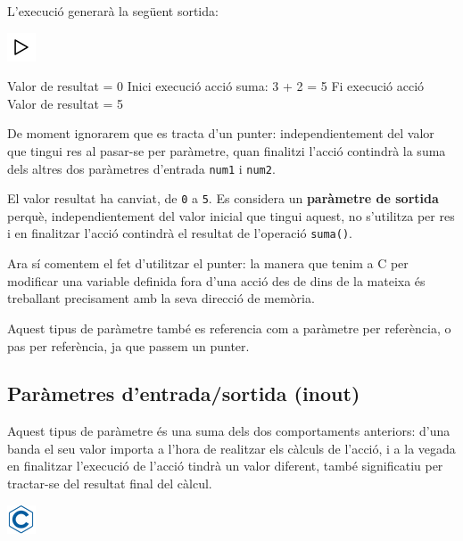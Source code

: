 \documentclass[]{book}
\newenvironment{Shaded}{\begin{snugshade}}{\end{snugshade}}
\newcommand{\DecValTok}[1]{\textcolor[rgb]{0.00,0.00,0.81}{#1}}
\newcommand{\NormalTok}[1]{#1}
\begin{document}
L'execució generarà la següent sortida:

\includegraphics{./img/play.png}

\begin{Shaded}
\begin{Highlighting}[]
\NormalTok{Valor de resultat = }\DecValTok{0}
\NormalTok{Inici execució acció}
\NormalTok{suma: }\DecValTok{3}\NormalTok{ + }\DecValTok{2}\NormalTok{ = }\DecValTok{5}
\NormalTok{Fi execució acció}
\NormalTok{Valor de resultat = }\DecValTok{5}
\end{Highlighting}
\end{Shaded}

De moment ignorarem que es tracta d'un punter: independientement del
valor que tingui res al pasar-se per paràmetre, quan finalitzi l'acció
contindrà la suma dels altres dos paràmetres d'entrada \texttt{num1} i
\texttt{num2}.

El valor resultat ha canviat, de \texttt{0} a \texttt{5}. Es considera
un \textbf{paràmetre de sortida} perquè, independientement del valor
inicial que tingui aquest, no s'utilitza per res i en finalitzar l'acció
contindrà el resultat de l'operació \texttt{suma()}.

Ara sí comentem el fet d'utilitzar el punter: la manera que tenim a C
per modificar una variable definida fora d'una acció des de dins de la
mateixa és treballant precisament amb la seva direcció de memòria.

Aquest tipus de paràmetre també es referencia com a paràmetre per
referència, o pas per referència, ja que passem un punter.

\subsection{Paràmetres d'entrada/sortida
(inout)}\label{parametres-dentradasortida-inout}

Aquest tipus de paràmetre és una suma dels dos comportaments anteriors:
d'una banda el seu valor importa a l'hora de realitzar els càlculs de
l'acció, i a la vegada en finalitzar l'execució de l'acció tindrà un
valor diferent, també significatiu per tractar-se del resultat final del
càlcul.

\includegraphics{./img/c.png}
\end{document}
